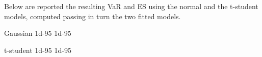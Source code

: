 Below are reported the resulting VaR and ES using the normal and the t-student models, computed passing in turn the two fitted models.

\begin{ioutput}
Gaussian
1d-95%
1d-95%

t-student
1d-95%
1d-95%
\end{ioutput}

%
%
%
%
%

